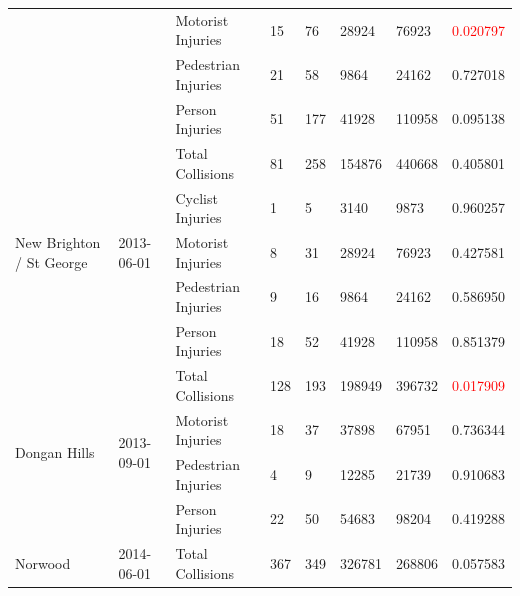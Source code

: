 \documentclass[10pt,journal,compsoc]{IEEEtran}
\begin{document}
\begin{table}[]
\begin{tabular}{|l|l|l|l|l|l|l|l|}
                                               &                             & Motorist Injuries   & 15        & 76       & 28924      & 76923     & \textcolor{red}{0.020797} \\ \cline{3-8} 
                                               &                             & Pedestrian Injuries & 21        & 58       & 9864       & 24162     & 0.727018 \\ \cline{3-8} 
                                               &                             & Person Injuries     & 51        & 177      & 41928      & 110958    & 0.095138 \\ \hline
\multirow{5}{*}{New Brighton / St George}      & \multirow{5}{*}{2013-06-01} & Total Collisions    & 81        & 258      & 154876     & 440668    & 0.405801 \\ \cline{3-8} 
                                               &                             & Cyclist Injuries    & 1         & 5        & 3140       & 9873      & 0.960257 \\ \cline{3-8} 
                                               &                             & Motorist Injuries   & 8         & 31       & 28924      & 76923     & 0.427581 \\ \cline{3-8} 
                                               &                             & Pedestrian Injuries & 9         & 16       & 9864       & 24162     & 0.586950 \\ \cline{3-8} 
                                               &                             & Person Injuries     & 18        & 52       & 41928      & 110958    & 0.851379 \\ \hline
\multirow{4}{*}{Dongan Hills}                  & \multirow{4}{*}{2013-09-01} & Total Collisions    & 128       & 193      & 198949     & 396732    & \textcolor{red}{0.017909} \\ \cline{3-8} 
                                               &                             & Motorist Injuries   & 18        & 37       & 37898      & 67951     & 0.736344 \\ \cline{3-8} 
                                               &                             & Pedestrian Injuries & 4         & 9        & 12285      & 21739     & 0.910683 \\ \cline{3-8} 
                                               &                             & Person Injuries     & 22        & 50       & 54683      & 98204     & 0.419288 \\ \hline
\multirow{5}{*}{Norwood}                       & \multirow{5}{*}{2014-06-01} & Total Collisions    & 367       & 349      & 326781     & 268806    & 0.057583 \\ \cline{3-8} 

\end{tabular}
\end{table}
\end{document}

